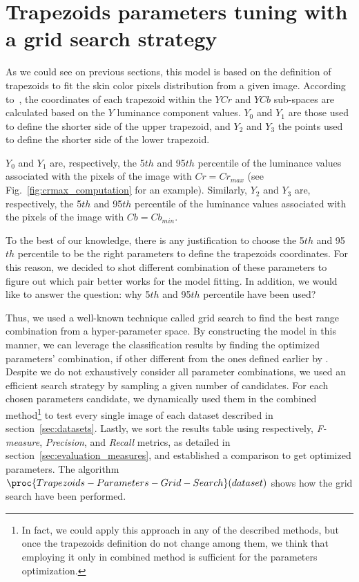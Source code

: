 \clearpage
\section{Trapezoids parameters tuning with a grid search strategy}
\label{sec:trapezoids_params_tunning}
\noindent As we could see on previous sections, this model is based on the definition of trapezoids to fit the skin color pixels distribution from a given image. According to~\citet{brancati:17}, the coordinates of each trapezoid within the $YCr$ and $YCb$ sub-spaces are calculated based on the $Y$ luminance component values. $Y_0$ and $Y_1$ are those used to define the shorter side of the upper trapezoid, and $Y_2$ and $Y_3$ the points used to define the shorter side of the lower trapezoid.

$Y_0$ and $Y_1$ are, respectively, the 5${th}$ and 95$th$ percentile of the luminance values associated with the pixels of the image with $Cr = Cr_{max}$ (see Fig.~\ref{fig:crmax_computation} for an example). Similarly, $Y_2$ and $Y_3$ are, respectively, the 5${th}$ and 95$th$ percentile of the luminance values associated with the pixels of the image with $Cb = Cb_{min}$.

To the best of our knowledge, there is any justification to choose the 5${th}$ and 95$th$ percentile to be the right parameters to define the trapezoids coordinates. For this reason, we decided to shot different combination of these parameters to figure out which pair better works for the model fitting. In addition, we would like to answer the question: why 5${th}$ and 95$th$ percentile have been used?

Thus, we used a well-known technique called grid search to find the best range combination from a hyper-parameter space. By constructing the model in this manner, we can leverage the classification results by finding the optimized parameters' combination, if other different from the ones defined earlier by \citet{brancati:17}. Despite we do not exhaustively consider all parameter combinations, we used an efficient search strategy by sampling a given number of candidates. For each chosen parameters candidate, we dynamically used them in the combined method\footnote{In fact, we could apply this approach in any of the described methods, but once the trapezoids definition do not change among them, we think that employing it only in combined method is sufficient for the parameters optimization.} to test every single image of each dataset described in section~\ref{sec:datasets}. Lastly, we sort the results table using respectively, \emph{F-measure}, \emph{Precision}, and \emph{Recall} metrics, as detailed in section~\ref{sec:evaluation_measures}, and established a comparison to get optimized parameters. The algorithm $\proc{Trapezoids-Parameters-Grid-Search}(dataset)$ shows how the grid search have been performed.

